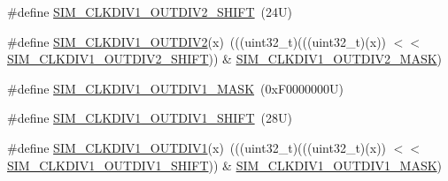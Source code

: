 \begin{DoxyCompactItemize}
\item 
\#define \mbox{\hyperlink{group___s_i_m___register___masks_ga6d6fd31143c3871c916062966b6fbc3b}{S\+I\+M\+\_\+\+C\+L\+K\+D\+I\+V1\+\_\+\+O\+U\+T\+D\+I\+V2\+\_\+\+S\+H\+I\+FT}}~(24\+U)
\item 
\#define \mbox{\hyperlink{group___s_i_m___register___masks_gacf3906094a4539818d91cfda55ae2141}{S\+I\+M\+\_\+\+C\+L\+K\+D\+I\+V1\+\_\+\+O\+U\+T\+D\+I\+V2}}(x)~(((uint32\+\_\+t)(((uint32\+\_\+t)(x)) $<$$<$ \mbox{\hyperlink{group___s_i_m___register___masks_ga6d6fd31143c3871c916062966b6fbc3b}{S\+I\+M\+\_\+\+C\+L\+K\+D\+I\+V1\+\_\+\+O\+U\+T\+D\+I\+V2\+\_\+\+S\+H\+I\+FT}})) \& \mbox{\hyperlink{group___s_i_m___register___masks_gad2d7b5c991f6db7ab2a3e6bc4d9c6aae}{S\+I\+M\+\_\+\+C\+L\+K\+D\+I\+V1\+\_\+\+O\+U\+T\+D\+I\+V2\+\_\+\+M\+A\+SK}})
\item 
\#define \mbox{\hyperlink{group___s_i_m___register___masks_ga1bd42e75000e91999a7d8c2f94a9b606}{S\+I\+M\+\_\+\+C\+L\+K\+D\+I\+V1\+\_\+\+O\+U\+T\+D\+I\+V1\+\_\+\+M\+A\+SK}}~(0x\+F0000000\+U)
\item 
\#define \mbox{\hyperlink{group___s_i_m___register___masks_ga2d45b701595bf4f2bc6a451508f94c25}{S\+I\+M\+\_\+\+C\+L\+K\+D\+I\+V1\+\_\+\+O\+U\+T\+D\+I\+V1\+\_\+\+S\+H\+I\+FT}}~(28\+U)
\item 
\#define \mbox{\hyperlink{group___s_i_m___register___masks_ga288f4756a2240c6242f28335cc21a0a8}{S\+I\+M\+\_\+\+C\+L\+K\+D\+I\+V1\+\_\+\+O\+U\+T\+D\+I\+V1}}(x)~(((uint32\+\_\+t)(((uint32\+\_\+t)(x)) $<$$<$ \mbox{\hyperlink{group___s_i_m___register___masks_ga2d45b701595bf4f2bc6a451508f94c25}{S\+I\+M\+\_\+\+C\+L\+K\+D\+I\+V1\+\_\+\+O\+U\+T\+D\+I\+V1\+\_\+\+S\+H\+I\+FT}})) \& \mbox{\hyperlink{group___s_i_m___register___masks_ga1bd42e75000e91999a7d8c2f94a9b606}{S\+I\+M\+\_\+\+C\+L\+K\+D\+I\+V1\+\_\+\+O\+U\+T\+D\+I\+V1\+\_\+\+M\+A\+SK}})
\end{DoxyCompactItemize}
